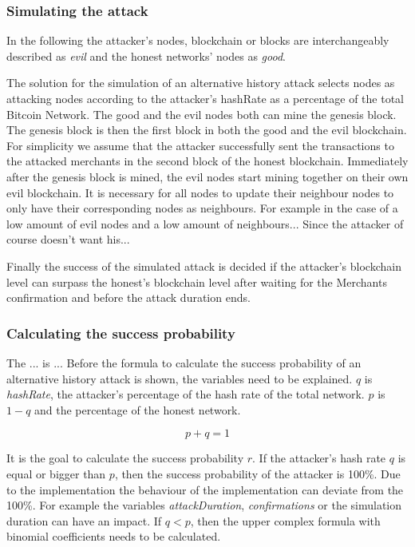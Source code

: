 \subsubsection{Simulating the attack}

In the following the attacker's nodes, blockchain or blocks are interchangeably described as \textit{evil} and the honest networks' nodes as \textit{good}.\linebreak

The solution for the simulation of an alternative history attack selects nodes as attacking nodes according to the attacker's hashRate as a percentage of the total Bitcoin Network.
The good and the evil nodes both can mine the genesis block. The genesis block is then the first block in both the good and the evil blockchain. For simplicity we assume that the attacker successfully sent the transactions to the attacked merchants in the second block of the honest blockchain. Immediately after the genesis block is mined, the evil nodes start mining together on their own evil blockchain. It is necessary for all nodes to update their neighbour nodes to only have their corresponding nodes as neighbours. For example in the case of a low amount of evil nodes and a low amount of neighbours... Since the attacker of course doesn't want his...\linebreak

Finally the success of the simulated attack is decided if the attacker's blockchain level can surpass the honest's blockchain level after waiting for the Merchants confirmation and before the attack duration ends.

\subsubsection{Calculating the success probability  \cite{doublespending}}

The ... is ...
Before the formula to calculate the success probability of an alternative history attack is shown, the variables need to be explained.\linebreak
$q$ is \textit{hashRate}, the attacker's percentage of the hash rate of the total network. $p$ is $1-q$ and the percentage of the honest network.

\begin{equation}
p + q = 1
\end{equation}

It is the goal to calculate the success probability $r$. If the attacker's hash rate $q$ is equal or bigger than $p$, then the success probability of the attacker is 100\%.\newline
Due to the implementation the behaviour of the implementation can deviate from the 100\%. For example the variables \textit{attackDuration}, \textit{confirmations} or the simulation duration can have an impact.\newline
If $q < p$, then the upper complex formula with binomial coefficients needs to be calculated.

